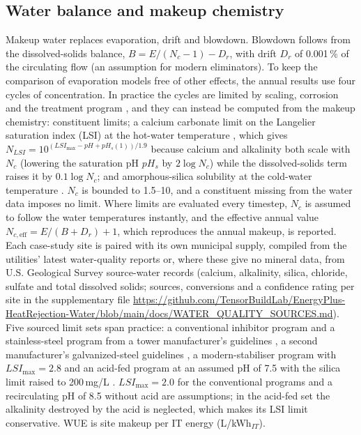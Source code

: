 \documentclass[preprint,12pt]{elsarticle}
\begin{document}
\subsection{Water balance and makeup chemistry}\label{sec:chem}
Makeup water replaces evaporation, drift and blowdown. Blowdown follows from the dissolved-solids balance,
$B = E/(N_c-1) - D_r$, with drift $D_r$ of 0.001\,\% of the circulating flow (an assumption for modern eliminators). To
keep the comparison of evaporation models free of other effects, the annual results use four cycles of concentration.
In practice the cycles are limited by scaling, corrosion and the treatment program
\citep{ashrae2023water,altman2012membrane,soliman2022treatment}, and they can instead be computed from the makeup
chemistry: constituent limits; a calcium carbonate limit on the Langelier saturation index (LSI) at the hot-water
temperature \citep{langelier1936analytical}, which gives $N_{LSI}=10^{(LSI_{\max}-pH+pH_s(1))/1.9}$ because calcium and
alkalinity both scale with $N_c$ (lowering the saturation pH $pH_s$ by $2\log N_c$) while the dissolved-solids term raises
it by $0.1\log N_c$; and amorphous-silica solubility at the cold-water temperature \citep{fournier1977chemical}. $N_c$ is
bounded to 1.5--10, and a constituent missing from the water data imposes no limit. Where limits are evaluated every
timestep, $N_c$ is assumed to follow the water temperatures instantly, and the effective annual value
$N_{c,\mathrm{eff}}=E/(B+D_r)+1$, which reproduces the annual makeup, is reported. Each case-study site is paired with its
own municipal supply, compiled from the utilities' latest water-quality reports or, where these give no mineral data,
from U.S. Geological Survey source-water records (calcium, alkalinity, silica, chloride, sulfate and total dissolved
solids; sources, conversions and a confidence rating per site in the supplementary file
\url{https://github.com/TensorBuildLab/EnergyPlus-HeatRejection-Water/blob/main/docs/WATER_QUALITY_SOURCES.md}). Five sourced limit sets span practice: a conventional inhibitor program and a
stainless-steel program from a tower manufacturer's guidelines \citep{evapco2019om}, a second manufacturer's
galvanized-steel guidelines \citep{bac2020baltibond}, a modern-stabiliser program with $LSI_{\max}=2.8$
\citep{icc2014gew174} and an acid-fed program at an assumed pH of 7.5 with the silica limit raised to 200\,mg/L
\citep{demadis2003gordian}. $LSI_{\max}=2.0$ for the conventional programs and a recirculating pH of 8.5 without acid are
assumptions; in the acid-fed set the alkalinity destroyed by the acid is neglected, which makes its LSI limit
conservative. WUE is site makeup per IT energy (L/kWh$_{IT}$).
\end{document}
